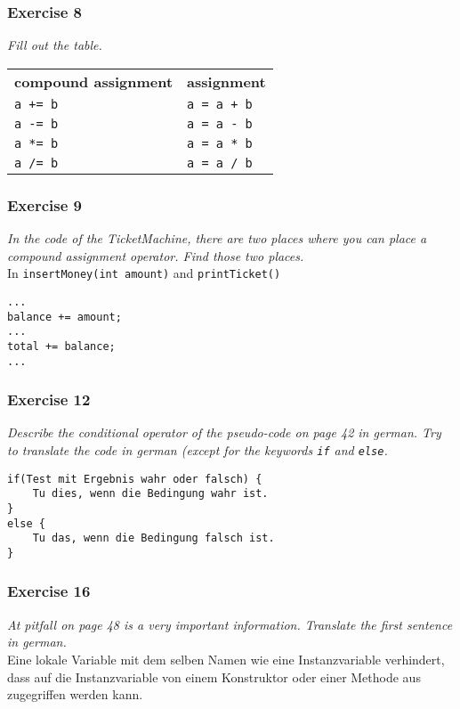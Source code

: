\subsubsection*{Exercise 8}
\textit{Fill out the table.}\\
\begin{table}
	\centering
	\begin{tabular}{ll}
		\textbf{compound assignment} & \textbf{assignment} \\
		\lstinline!a += b! & \lstinline!a = a + b! \\
		\lstinline!a -= b! & \lstinline!a = a - b! \\
		\lstinline!a *= b! & \lstinline!a = a * b! \\
		\lstinline!a /= b! & \lstinline!a = a / b! \\
	\end{tabular}
\end{table}

\subsubsection*{Exercise 9}
\textit{In the code of the TicketMachine, there are two places where you
	can place a compound assignment operator. Find those two 
	places.}\\
In \lstinline{insertMoney(int amount)} and \lstinline{printTicket()}
\begin{lstlisting}[caption=places eith the placed compound assignment operator]
...
balance += amount;
...
total += balance;
...
\end{lstlisting}

\subsubsection*{Exercise 12}
\textit{Describe the conditional operator of the pseudo-code on page 42
	in german. Try to translate the code in german (except for the keywords
	\lstinline{if} and \lstinline{else}.}\\
\begin{lstlisting}[caption=translated conditional operator]
if(Test mit Ergebnis wahr oder falsch) {
	Tu dies, wenn die Bedingung wahr ist. 
}
else {
	Tu das, wenn die Bedingung falsch ist. 
}
\end{lstlisting}

\subsubsection*{Exercise 16}
\textit{At pitfall on page 48 is a very important information.
	Translate the first sentence in german.}\\
Eine lokale Variable mit dem selben Namen wie eine Instanzvariable verhindert, 
dass auf die Instanzvariable von einem Konstruktor oder einer Methode aus 
zugegriffen werden kann. 

